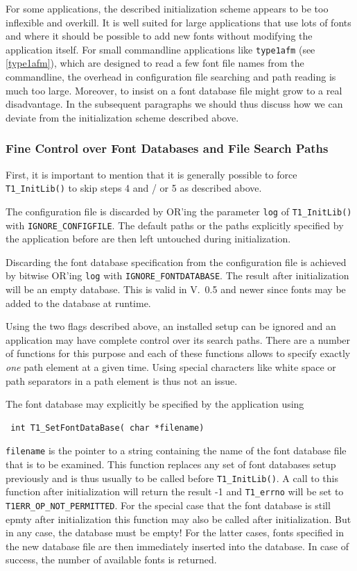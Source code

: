 For some applications, the described initialization scheme appears to be too
inflexible and overkill. It is well suited for large applications that use
lots of fonts and where it should be possible to add new fonts without
modifying the application itself. For small commandline applications like
\verb+type1afm+ (see \ref{type1afm}), which are designed to read a few font file
names from the commandline, the overhead in configuration file searching and
path reading is much too large. Moreover, to insist on a font database file
might grow to a real disadvantage. In the subsequent paragraphs we should thus
discuss how we can deviate from the initialization scheme described above.

\subsubsection{Fine Control over Font Databases and File Search Paths}
\label{manipulatingpaths}%
First, it is important to mention that it is generally possible to force
\verb+T1_InitLib()+ to skip steps 4 and / or 5 as described above. 

The configuration file is discarded by OR'ing the parameter \verb+log+ of
\verb+T1_InitLib()+ with \verb+IGNORE_CONFIGFILE+.
The default paths or the paths explicitly specified by the application before
are then left untouched during initialization.

Discarding the font database specification from the configuration file is
achieved by bitwise OR'ing \verb+log+ with \verb+IGNORE_FONTDATABASE+. The
result after initialization will be an empty database. This is valid in V.\ 
0.5 and newer since fonts may be added to the database at runtime.

Using the two flags described above, an installed setup can be ignored and an
application may have complete control over its search paths. There are a
number of functions for this purpose and each of these functions allows to
specify exactly {\em one} path element at a given time. Using special
characters like white space or path separators in a path element is thus not
an issue.

The font database may explicitly be specified by the
application using \precorr
\begin{verbatim}
 int T1_SetFontDataBase( char *filename)
\end{verbatim}\postcorr
\verb+filename+ is the pointer to a string containing the name of the font
database file that is to be examined. This function replaces any set of font
databases setup previously and is thus usually to be called before
\verb+T1_InitLib()+. A call to this function after initialization will return
the result -1 and \verb+T1_errno+ will be set to
\verb+T1ERR_OP_NOT_PERMITTED+. For the special case that the font database is
still epmty after initialization this function may also be called after
initialization. But in any case, the database must be empty! For the latter
cases, fonts specified in the new database file are then immediately inserted
into the database. In case of success, the number of available fonts is returned. 

